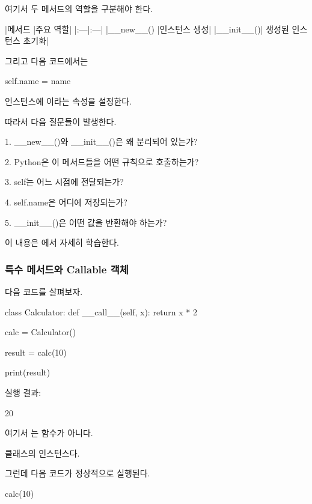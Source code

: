 여기서 두 메서드의 역할을 구분해야 한다.

\begin{dhktable}
|메서드	|주요 역할|
|:---|:---|
|__new__()	|인스턴스 생성|
|__init__()|	생성된 인스턴스 초기화|
\end{dhktable}

그리고 다음 코드에서는

\begin{dhkcode}
self.name = name
\end{dhkcode}

인스턴스에 이라는 속성을 설정한다.

따라서 다음 질문들이 발생한다.

\begin{dhksmry}
    1. __new__()와 __init__()은 왜 분리되어 있는가?

    2. Python은 이 메서드들을 어떤 규칙으로 호출하는가?

    3. self는 어느 시점에 전달되는가?

    4. self.name은 어디에 저장되는가?

    5. __init__()은 어떤 값을 반환해야 하는가?
\end{dhksmry}

이 내용은 에서 자세히 학습한다.

\subsubsection{특수 메서드와 Callable 객체}

다음 코드를 살펴보자.

\begin{dhkcode}
class Calculator:
    def __call__(self, x):
        return x * 2

calc = Calculator()

result = calc(10)

print(result)
\end{dhkcode}

실행 결과:

\begin{dhkzsh}
20
\end{dhkzsh}

여기서 는 함수가 아니다.

 클래스의 인스턴스다.

그런데 다음 코드가 정상적으로 실행된다.

\begin{dhkcode}
calc(10)
\end{dhkcode}

